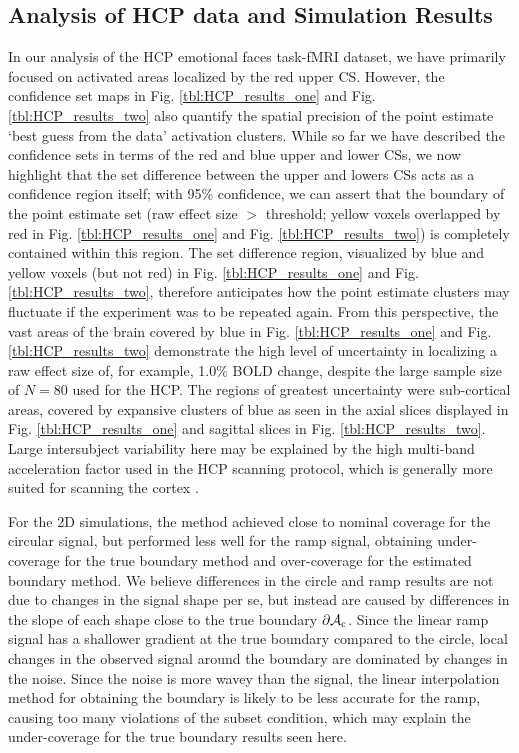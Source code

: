 \subsection{Analysis of HCP data and Simulation Results}
\label{sec:discussion_HCP_simultations}
In our analysis of the HCP emotional faces task-fMRI dataset, we have primarily focused on activated areas localized by the red upper CS. However, the confidence set maps in Fig. \ref{tbl:HCP_results_one} and Fig. \ref{tbl:HCP_results_two} also quantify the spatial precision of the point estimate `best guess from the data' activation clusters. While so far we have described the confidence sets in terms of the red and blue upper and lower CSs, we now highlight that the set difference between the upper and lowers CSs acts as a confidence region itself; with 95\% confidence, we can assert that the boundary of the point estimate set (raw effect size $>$ threshold; yellow voxels overlapped by red in Fig. \ref{tbl:HCP_results_one} and Fig. \ref{tbl:HCP_results_two}) is completely contained within this region. The set difference region, visualized by blue and yellow voxels (but not red) in Fig. \ref{tbl:HCP_results_one} and Fig. \ref{tbl:HCP_results_two}, therefore anticipates how the point estimate clusters may fluctuate if the experiment was to be repeated again. From this perspective, the vast areas of the brain covered by blue in Fig. \ref{tbl:HCP_results_one} and Fig. \ref{tbl:HCP_results_two} demonstrate the high level of uncertainty in localizing a raw effect size of, for example, 1.0\% BOLD change, despite the large sample size of $N = 80$ used for the HCP. The regions of greatest uncertainty were sub-cortical areas, covered by expansive clusters of blue as seen in the axial slices displayed in Fig. \ref{tbl:HCP_results_one} and sagittal slices in Fig. \ref{tbl:HCP_results_two}. Large intersubject variability here may be explained by the high multi-band acceleration factor used in the HCP scanning protocol, which is generally more suited for scanning the cortex \citep{Smith2013-ul}. 

For the 2D simulations, the method achieved close to nominal coverage for the circular signal, but performed less well for the ramp signal, obtaining under-coverage for the true boundary method and over-coverage for the estimated boundary method. We believe differences in the circle and ramp results are not due to changes in the signal shape per se, but instead are caused by differences in the slope of each shape close to the true boundary $\operatorname{\partial\mathcal{A}_{c}}$. Since the linear ramp signal has a shallower gradient at the true boundary compared to the circle, local changes in the observed signal around the boundary are dominated by changes in the noise. Since the noise is more wavey than the signal, the linear interpolation method for obtaining the boundary is likely to be less accurate for the ramp, causing too many violations of the subset condition, which may explain the under-coverage for the true boundary results seen here.

